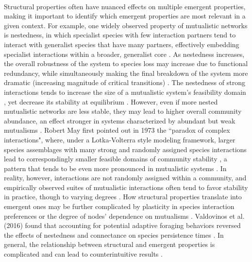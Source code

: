 \paragraph*{} 
Structural properties often have nuanced effects on multiple emergent properties, making it important to identify which emergent properties are most relevant in a given context. For example, one widely observed property of mutualistic networks is nestedness, in which specialist species with few interaction partners tend to interact with generalist species that have many partners, effectively embedding specialist interactions within a broader, generalist core \parencite{bascompte2003nested, bascompte2006asymmetric, thebault2010stability}. As nestedness increases, the overall robustness of the system to species loss may increase due to functional redundancy, while simultaneously making the final breakdown of the system more dramatic (increasing magnitude of critical transitions) \parencite{bascompte2022resilience}. The nestedness of strong interactions tends to increase the size of a mutualistic system's feasibility domain \parencite{saavedra2016nested}, yet decrease its stability at equilibrium \parencite{allesina2012stability}. However, even if more nested mutualistic networks are less stable, they may lead to higher overall community abundance, an effect stronger in systems characterized by abundant but weak mutualisms \parencite{suweis2013emergence}. Robert May first pointed out in 1973 the ``paradox of complex interactions", where, under a Lotka-Volterra style modeling framework, larger species assemblages with many strong and randomly assigned species interactions lead to correspondingly smaller feasible domains of community stability \parencite{may1973stability}, a pattern that tends to be even more pronounced in mutualistic systems \parencite{allesina2012stability, saavedra2016nested}.  In reality, however, interactions are not randomly assigned within a community, and empirically observed suites of mutualistic interactions often tend to favor stability in practice, though to varying degrees \parencite{thebault2010stability, grilli2017feasibility}. How structural properties translate into emergent ones may be further complicated by plasticity in species interaction preferences \parencite{corro2021annual} or the degree of nodes' dependence on mutualisms \parencite{van2021facultative}. Valdovinos et al. (2016) found that accounting for potential adaptive foraging behaviors reversed the effects of nestedness and connectance on species persistence times \parencite{valdovinos2016niche}. In general, the relationship between structural and emergent properties is complicated and can lead to counterintuitive results \parencite{landi2018complexity}.

